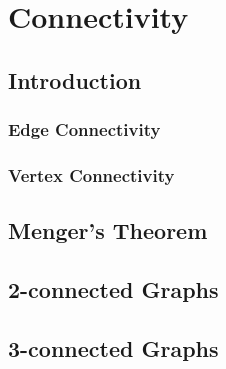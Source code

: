 \chapter{Connectivity}

\section{Introduction}
\subsection{Edge Connectivity}
\subsection{Vertex Connectivity}

\section{Menger's Theorem}

\section{2-connected Graphs}

\section{3-connected Graphs}
